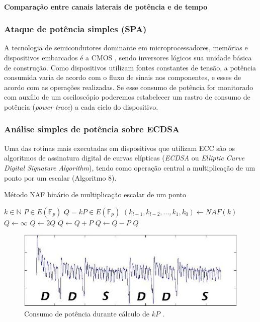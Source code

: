 \paragraph{Comparação entre canais laterais de potência e de tempo}

\subsubsection{Ataque de potência simples (SPA)}
A tecnologia de semicondutores dominante em microprocessadores, mem\'{o}rias e dispositivos embarcados \'{e} a CMOS   \cite{sedra:1997}, sendo inversores l\'{o}gicos sua unidade b\'{a}sica de constru\c{c}\~{a}o. Como dispositivos utilizam fontes constantes de tens\~{a}o, a pot\^{e}ncia consumida varia de acordo com o fluxo de sinais nos componentes, e esses de acordo com as opera\c{c}\~{o}es realizadas. Se esse consumo de pot\^{e}ncia for monitorado com aux\'{i}lio de um oscilosc\'{o}pio poderemos estabelecer um rastro de consumo de pot\^{e}ncia (\textit{power trace}) a cada ciclo do dispositivo.

\subsubsection{An\'{a}lise simples de pot\^{e}ncia sobre ECDSA}
Uma das rotinas mais executadas em dispositivos que utilizam ECC s\~{a}o os algoritmos de assinatura digital de curvas el\'{i}pticas (\textit{ECDSA} ou \textit{Elliptic Curve Digital Signature Algorithm}), tendo como opera\c{c}\~{a}o central a multiplica\c{c}\~{a}o de um ponto por um escalar (Algoritmo 8).

\begin{algorithm}[H]
\caption{M\'{e}todo NAF bin\'{a}rio de multiplica\c{c}\~{a}o escalar de um ponto}
\begin{algorithmic}
    \REQUIRE $k \in \mathbb{N}$
    \REQUIRE $P \in E(\mathbb{F}_p)$
    \ENSURE $Q = kP \in E(\mathbb{F}_p)$
    \STATE $(k_{l-1}, k_{l-2}, ..., k_{1}, k_{0}) \leftarrow NAF(k)$
    \STATE $Q \leftarrow \infty$
        \STATE $Q \leftarrow 2Q$
            \STATE $Q \leftarrow Q + P$
        \ENDIF
            \STATE $Q \leftarrow Q - P$
        \ENDIF
    \ENDFOR
    \RETURN $Q$
    \end{algorithmic}
\end{algorithm}

\begin{figure}[ht]
	\centering
	\includegraphics[width=.8\textwidth]{figures/spa1.jpg}
	\caption{Consumo de pot\^{e}ncia durante c\'{a}lculo de $kP$ \cite{ECCBook_HankersonVanstone2004}.}
	\label{fig:Fig5}
\end{figure}

